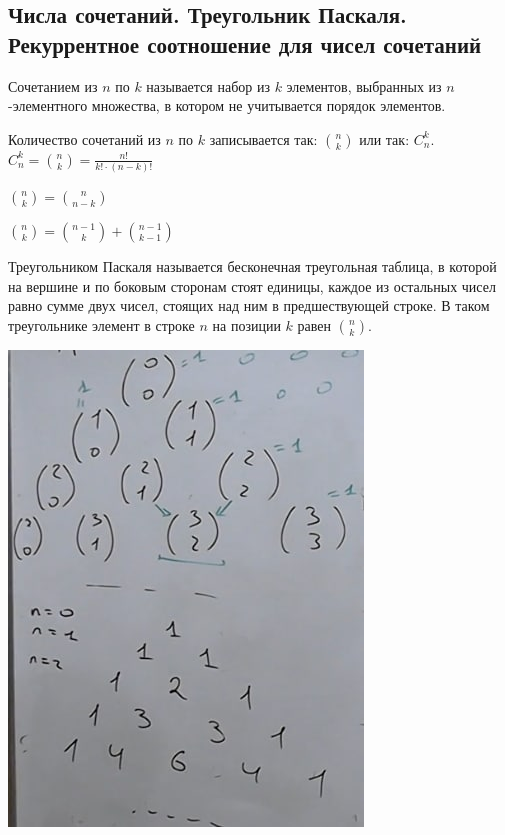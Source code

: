 \subsection{Числа сочетаний. Треугольник Паскаля. Рекуррентное соотношение для чисел сочетаний}

Сочетанием из $n$ по $k$ называется набор из $k$ элементов, выбранных из $n$-элементного множества, в котором не учитывается порядок элементов.

Количество сочетаний из $n$ по $k$ записывается так: $\binom{n}{k}$ или так: $C^k_n$. $C^k_n =\binom{n}{k} = \frac{n!}{k!\cdot(n-k)!}$

$\binom{n}{k} = \binom{n}{n-k}$

$\binom{n}{k} = \binom{n-1}{k} + \binom{n-1}{k-1}$

Треугольником Паскаля называется бесконечная треугольная таблица, в которой на вершине и по боковым сторонам стоят единицы, каждое из остальных чисел равно сумме двух чисел, стоящих над ним в предшествующей строке. В таком треугольнике элемент в строке $n$ на позиции $k$ равен $\binom{n}{k}$.

\includegraphics[scale=1]{definitions/images/pascal.png}